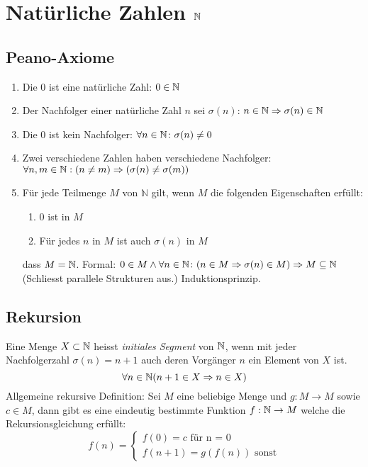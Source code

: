 \section{Natürliche Zahlen $\mathbb{N}$}
\subsection{Peano-Axiome}
\begin{enumerate}
\item Die 0 ist eine natürliche Zahl: $0 \in \mathbb{N}$
\item Der Nachfolger einer natürliche Zahl $n$ sei $\sigma(n)$: $n \in \mathbb{N} \Rightarrow \sigma(n) \in \mathbb{N}$
\item Die 0 ist kein Nachfolger: $\forall n \in \mathbb{N} \colon \sigma(n) \neq 0$
\item Zwei verschiedene Zahlen haben verschiedene Nachfolger: $\forall n, m \in \mathbb{N}: (n \neq m) \Rightarrow (\sigma(n) \neq \sigma(m))$
\item Für jede Teilmenge $M$ von $\mathbb{N}$ gilt, wenn $M$ die folgenden Eigenschaften erfüllt:
	\begin{enumerate}
		\item 0 ist in $M$
		\item Für jedes $n$ in $M$ ist auch $\sigma(n)$ in $M$
	\end{enumerate}
	dass $M = \mathbb{N}$. Formal: $0\in M \wedge \forall n \in \mathbb{N} \colon (n \in M \Rightarrow \sigma(n)\in M) \Rightarrow M \subseteq \mathbb{N}$\\
	(Schliesst parallele Strukturen aus.) Induktionsprinzip.
\end{enumerate}

\subsection{Rekursion}
Eine Menge $X \subset \mathbb{N}$ heisst \textit{initiales Segment} von $\mathbb{N}$, wenn mit jeder Nachfolgerzahl $\sigma(n) = n + 1$ auch deren Vorgänger $n$ ein Element von $X$ ist.
\begin{equation*}
 \forall n \in \mathbb{N} (n + 1 \in X \Rightarrow n \in X)
\end{equation*}
Allgemeine rekursive Definition: Sei $M$ eine beliebige Menge und $g: M \to M$ sowie $c \in M$, dann gibt es eine eindeutig bestimmte Funktion $f: \mathbb{N} \to M$ welche die Rekursionsgleichung erfüllt:
\begin{equation*}
 f(n) = \begin{cases}
         f(0) = c \mbox{ für n = 0}\\
	 f(n + 1) = g(f(n)) \mbox{ sonst}
        \end{cases}
\end{equation*}

